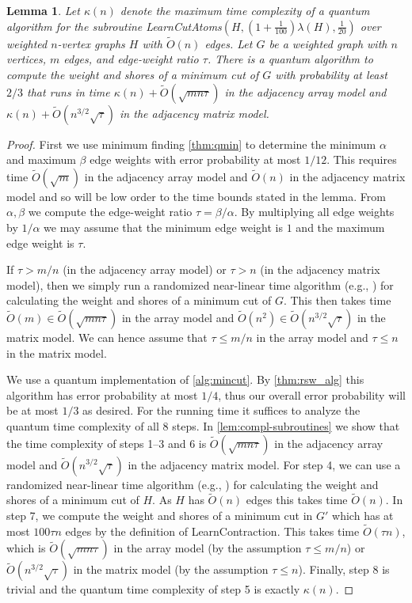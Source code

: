 \documentclass[10pt,a4paper]{article}
\newcommand{\tO}{\tilde O}
\newcommand{\1}{\mathbf{1}}
\newtheorem{lemma}[theorem]{Lemma}
\theoremstyle{definition}
\begin{document}
\begin{lemma}
\label{lem:kappa}
Let $\kappa(n)$ denote the maximum time complexity of a quantum algorithm for the subroutine LearnCutAtoms$(H,(1+\frac{1}{100})\lambda(H),\frac{1}{20})$ over weighted $n$-vertex graphs $H$ with $\tO(n)$ edges.
Let $G$ be a weighted graph with $n$ vertices, $m$ edges, and edge-weight ratio $\tau$.
There is a quantum algorithm to compute the weight and shores of a minimum cut of $G$ with probability at least $2/3$
that runs in time $\kappa(n) + \tO(\sqrt{mn\tau})$ in the adjacency array model and 
$\kappa(n) + \tO(n^{3/2}\sqrt{\tau})$ in the adjacency matrix model.
\end{lemma}
\begin{proof}
First we use minimum finding \cref{thm:qmin} to determine the minimum $\alpha$ and maximum $\beta$ edge weights with error probability at most $1/12$.  This requires time 
$\tO(\sqrt{m})$ in the adjacency array model and $\tO(n)$ in the adjacency matrix model and so will be low order to the time bounds stated in the lemma.  From $\alpha, \beta$ we compute the 
edge-weight ratio $\tau = \beta/\alpha$.  By multiplying all edge weights by $1/\alpha$ we may assume that the minimum edge weight is $1$ and 
the maximum edge weight is $\tau$.

If $\tau > m/n$ (in the adjacency array model) or $\tau > n$ (in the adjacency matrix model), then we simply run a randomized near-linear time algorithm (e.g., \cite{Karger00}) for calculating the weight and shores of a minimum cut of $G$.
This then takes time $\tO(m) \in \tO(\sqrt{mn\tau})$ in the array model and $\tO(n^2) \in \tO(n^{3/2}\sqrt{\tau})$ in the matrix model.
We can hence assume that $\tau \leq m/n$ in the array model and $\tau \leq n$ in the matrix model.

We use a quantum implementation of \cref{alg:mincut}.  By \cref{thm:rsw_alg} this algorithm has error probability at most $1/4$, thus our overall error probability will be at most $1/3$ as desired.  
For the running time it suffices to analyze the quantum time complexity of all 8 steps.
In \cref{lem:compl-subroutines} we show that the time complexity of steps 1--3 and 6 is $\tO(\sqrt{mn\tau})$ in the adjacency array model and $\tO(n^{3/2}\sqrt{\tau})$ in the adjacency matrix model.
For step 4, we can use a randomized near-linear time algorithm (e.g., \cite{Karger00}) for calculating the weight and shores of a minimum cut of $H$.  As $H$ has $\tO(n)$ edges this takes time $\tO(n)$.
In step 7, we compute the weight and shores of a minimum cut in $G'$ which has at most $100\tau n$ edges by the definition of LearnContraction.  This takes time $\tO(\tau n)$, which is $\tO(\sqrt{mn\tau})$ in the array model (by the assumption $\tau \leq m/n$) or $\tO(n^{3/2} \sqrt{\tau})$ in the matrix model (by the assumption $\tau \leq n$).
Finally, step 8 is trivial and the quantum time complexity of step 5 is exactly $\kappa(n)$.
\end{proof}
\end{document}
